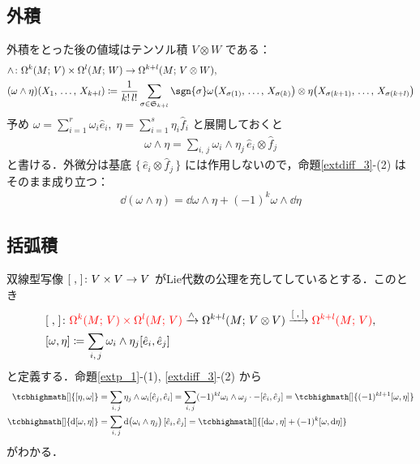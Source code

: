 \documentclass[geometry_main]{subfiles}
\begin{document}
\subsection{外積}

外積をとった後の値域はテンソル積 $V \otimes W$ である：
\begin{align}
	&\wedge \colon \Omega^k(M;\, V) \times \Omega^l(M;\, W) \to \Omega^{k+l}(M;\, V \otimes W),\\
	&(\omega \wedge \eta)(X_1,\, \dots ,\, X_{k+l}) \coloneqq \frac{1}{k!\, l!}\sum_{\sigma \in \mathfrak{S}_{k+l}} \sgn{\sigma} \omega\bigl(X_{\sigma(1)},\, \dots ,\, X_{\sigma(k)}\bigr) \otimes \eta\bigl(X_{\sigma(k+1)},\, \dots ,\, X_{\sigma(k+l)}\bigr)
\end{align}
予め $\omega = \sum_{i=1}^r \omega_i \hat{e}_i,\; \eta = \sum_{i=1}^s \eta_i \hat{f}_i$ と展開しておくと
\begin{align}
	\omega \wedge \eta = \sum_{i,\, j} \omega_i \wedge \eta_j\, \hat{e}_i \otimes \hat{f}_j
\end{align}
と書ける．外微分は基底 $\{\, \hat{e}_i \otimes \hat{f}_j\, \}$ には作用しないので，命題\ref{extdiff_3}-(2) はそのまま成り立つ：
\begin{align}
	\dd{(\omega \wedge \eta)} = \dd{\omega} \wedge \eta + (-1)^k \omega \wedge \dd{\eta}
\end{align}

\subsection{括弧積}

双線型写像 $\comm{\;}{\;} \colon V \times V \to V$ がLie代数の公理を充してしているとする．このとき
\begin{align}
	&\comm{\;}{\;} \colon \textcolor{red}{\Omega^k(M;\, V) \times \Omega^l(M;\, V)} \xrightarrow{\wedge} \Omega^{k+l}(M;\, V \otimes V) \xrightarrow{\comm{\;}{\;}} \textcolor{red}{\Omega^{k+l}(M;\, V)},\\
	&\comm{\omega}{\eta} \coloneqq \sum_{i,\, j} \omega_i \wedge \eta_j \comm{\hat{e}_i}{\hat{e}_j}
\end{align}
と定義する．命題\ref{extp_1}-(1), \ref{extdiff_3}-(2) から
\begin{align}
	\tcbhighmath[]{\comm{\eta}{\omega}} &= \sum_{i,\, j} \eta_j \wedge \omega_i \comm{\hat{e}_j}{\hat{e}_i} = \sum_{i,\, j} (-1)^{kl} \omega_i \wedge \omega_j \cdot -\comm{\hat{e}_i}{\hat{e}_j} = \tcbhighmath[]{(-1)^{kl+1} \comm{\omega}{\eta}} \\
	\tcbhighmath[]{\dd{\comm{\omega}{\eta}}} &= \sum_{i,\, j} \dd{\bigl( \omega_i \wedge \eta_j \bigr)} \comm{\hat{e}_i}{\hat{e}_j} = \tcbhighmath[]{\comm{\dd{\omega}}{\eta} + (-1)^k \comm{\omega}{\dd{\eta}} }
\end{align}
がわかる．
\end{document}
